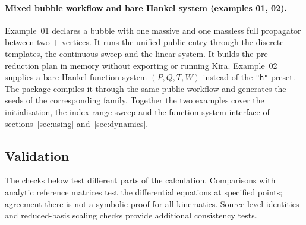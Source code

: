 \documentclass[11pt,a4paper]{article}
\begin{document}
\paragraph{Mixed bubble workflow and bare Hankel system (examples 01, 02).}
Example~01 declares a bubble with one massive and one massless full propagator between two $+$ vertices.
It runs the unified public entry through the discrete templates, the continuous sweep and the
linear system. It builds the pre-reduction plan in memory without exporting or running Kira.
Example~02 supplies a bare Hankel function system $(P,Q,T,W)$ instead of the \texttt{"h"} preset.
The package compiles it through the same public workflow and generates the seeds of the
corresponding family. Together the two examples cover the initialisation, the index-range sweep and
the function-system interface of sections~\ref{sec:using} and~\ref{sec:dynamics}.

\subsection{Validation}
\label{sec:validation}

The checks below test different parts of the calculation. Comparisons with analytic reference
matrices test the differential equations at specified points; agreement there is not a symbolic
proof for all kinematics. Source-level identities and reduced-basis scaling checks provide
additional consistency tests.
\end{document}
